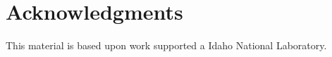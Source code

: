 \documentclass{anstrans}
\begin{document}
%

\section{Acknowledgments}
This material is based upon work supported a Idaho National Laboratory.



\end{document}
